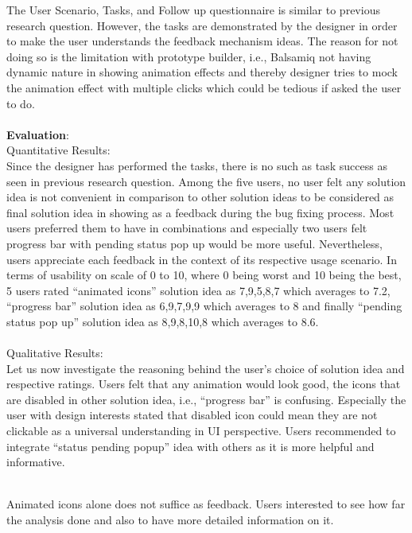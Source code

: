The User Scenario, Tasks, and Follow up questionnaire is similar to previous research question. However, the tasks are demonstrated by the designer in order to make the user understands the feedback mechanism ideas. The reason for not doing so is the limitation with prototype builder, i.e., Balsamiq not having dynamic nature in showing animation effects and thereby designer tries to mock the animation effect with multiple clicks which could be tedious if asked the user to do. \\ \\

\textbf{Evaluation}: \\ 

Quantitative Results: \\

Since the designer has performed the tasks, there is no such as task success as seen in previous research question. Among the five users, no user felt any solution idea is not convenient in comparison to other solution ideas to be considered as final solution idea in showing as a feedback during the bug fixing process.  Most users preferred them to have in combinations and especially two users felt progress bar with pending status pop up would be more useful. Nevertheless, users appreciate each feedback in the context of its respective usage scenario. In terms of usability on scale of 0 to 10, where 0 being worst and 10 being the best, 5 users rated “animated icons” solution idea as 7,9,5,8,7 which averages to 7.2, “progress bar” solution idea as 6,9,7,9,9 which averages to 8 and finally “pending status pop up” solution idea as 8,9,8,10,8 which averages to 8.6. \\ \\

Qualitative Results: \\

Let us now investigate the reasoning behind the user’s choice of solution idea and respective ratings. Users felt that any animation would look good, the icons that are disabled in other solution idea, i.e., “progress bar” is confusing. Especially the user with design interests stated that disabled icon could mean they are not clickable as a universal understanding in UI perspective. Users recommended to integrate “status pending popup” idea with others as it is more helpful and informative. \\ \\



\begin{myboxi}
	Animated icons alone does not suffice as feedback. Users interested to see how far the analysis done and also to have more detailed information on it.
\end{myboxi}

